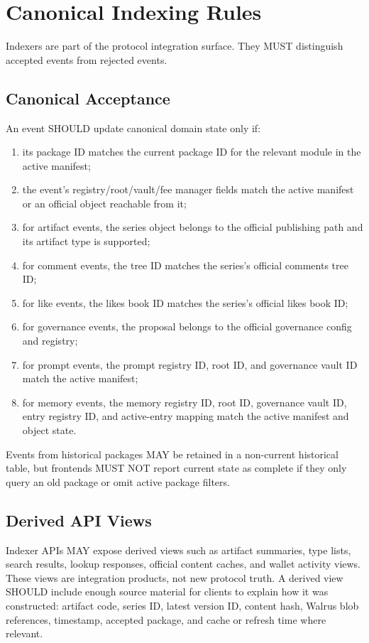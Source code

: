 \documentclass[11pt]{article}
\begin{document}
\section{Canonical Indexing Rules}

Indexers are part of the protocol integration surface. They MUST distinguish accepted events from rejected events.

\subsection{Canonical Acceptance}

An event SHOULD update canonical domain state only if:

\begin{enumerate}[leftmargin=*]
  \item its package ID matches the current package ID for the relevant module in the active manifest;
  \item the event's registry/root/vault/fee manager fields match the active manifest or an official object reachable from it;
  \item for artifact events, the series object belongs to the official publishing path and its artifact type is supported;
  \item for comment events, the tree ID matches the series's official comments tree ID;
  \item for like events, the likes book ID matches the series's official likes book ID;
  \item for governance events, the proposal belongs to the official governance config and registry;
  \item for prompt events, the prompt registry ID, root ID, and governance vault ID match the active manifest;
  \item for memory events, the memory registry ID, root ID, governance vault ID, entry registry ID, and active-entry mapping match the active manifest and object state.
\end{enumerate}

Events from historical packages MAY be retained in a non-current historical table, but frontends MUST NOT report current state as complete if they only query an old package or omit active package filters.

\subsection{Derived API Views}

Indexer APIs MAY expose derived views such as artifact summaries, type lists,
search results, lookup responses, official content caches, and wallet activity
views. These views are integration products, not new protocol truth. A derived
view SHOULD include enough source material for clients to explain how it was
constructed: artifact code, series ID, latest version ID, content hash, Walrus
blob references, timestamp, accepted package, and cache or refresh time where
relevant.
\end{document}
